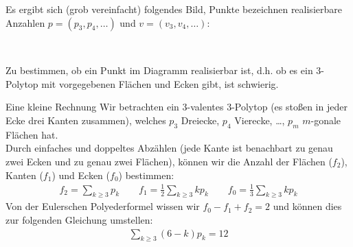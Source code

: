 \documentclass[10pt, notheorems]{beamer}
\begin{document}
\begin{frame}
  Es ergibt sich (grob vereinfacht) folgendes Bild, Punkte bezeichnen realisierbare Anzahlen $p = (p_3, p_4, \dots)$ und $v = (v_3, v_4, \dots)$:

  \vspace{0.5cm}
  { \centering
    \\
  }
  \vspace{0.5cm}
  \pause
  Zu bestimmen, ob ein Punkt im Diagramm realisierbar ist, d.h. ob es ein $3$-Polytop mit vorgegebenen Flächen und Ecken gibt, ist schwierig.
\end{frame}

\begin{frame}{Eine kleine Rechnung}
  Wir betrachten ein $3$-valentes $3$-Polytop (es stoßen in jeder Ecke drei Kanten zusammen), welches $p_3$ Dreiecke, $p_4$ Vierecke, \dots, $p_m$ $m$-gonale Flächen hat.\\
  \pause
  Durch  einfaches und doppeltes Abzählen (jede Kante ist benachbart zu genau zwei Ecken und zu genau zwei Flächen), können wir die Anzahl der Flächen ($f_2$), Kanten ($f_1$) und Ecken ($f_0$) bestimmen:
  \begin{align*}
    f_2 = \sum_{k \geq 3} p_k \qquad f_1 = \tfrac{1}{2}\sum_{k \geq 3} k p_k \qquad f_0 = \tfrac{1}{3}\sum_{k \geq 3} k p_k
  \end{align*}
  \pause
  Von der {\sc Euler}schen Polyederformel wissen wir $f_0 - f_1 + f_2 = 2$ und können dies zur folgenden Gleichung umstellen:
  \begin{align*}
    \sum_{k \geq 3} (6 - k) p_k = 12
  \end{align*}
\end{frame}
\end{document}
